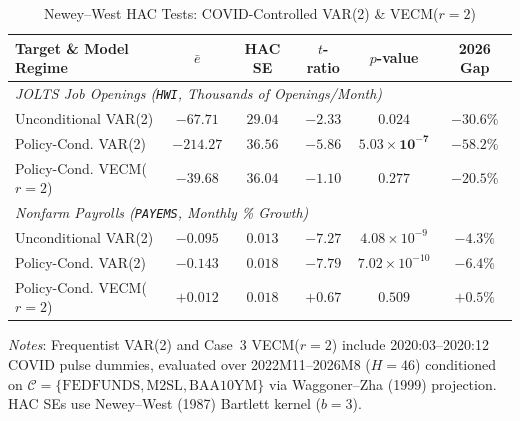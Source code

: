 \begin{table}[t]
\centering
\caption{Newey--West HAC Tests: COVID-Controlled VAR(2) \& VECM($r=2$)}
\label{tab:hac_tests}
\begin{minipage}{\columnwidth}
\centering
\fontsize{6.6pt}{8.0pt}\selectfont
\setlength{\tabcolsep}{1.5pt}
\begin{tabular}{lccccc}
\toprule
\textbf{Target \& Model Regime} & $\bar{e}$ & \textbf{HAC SE} & $t$-\textbf{ratio} & $p$-\textbf{value} & \textbf{2026 Gap} \\
\midrule
\multicolumn{6}{l}{\textit{JOLTS Job Openings (\texttt{HWI}, Thousands of Openings/Month)}} \\
Unconditional VAR(2) & $-67.71$ & $29.04$ & $-2.33$ & $0.024$ & $-30.6\%$ \\
Policy-Cond. VAR(2)  & $\mathbf{-214.27}$ & $\mathbf{36.56}$ & $\mathbf{-5.86}$ & $\mathbf{5.03 \times 10^{-7}}$ & $\mathbf{-58.2\%}$ \\
Policy-Cond. VECM($r=2$) & $-39.68$ & $36.04$ & $-1.10$ & $0.277$ & $-20.5\%$ \\
\midrule
\multicolumn{6}{l}{\textit{Nonfarm Payrolls (\texttt{PAYEMS}, Monthly \% Growth)}} \\
Unconditional VAR(2) & $-0.095$ & $0.013$ & $-7.27$ & $4.08 \times 10^{-9}$ & $-4.3\%$ \\
Policy-Cond. VAR(2)  & $-0.143$ & $0.018$ & $-7.79$ & $7.02 \times 10^{-10}$ & $-6.4\%$ \\
Policy-Cond. VECM($r=2$) & $\mathbf{+0.012}$ & $\mathbf{0.018}$ & $\mathbf{+0.67}$ & $\mathbf{0.509}$ & $\mathbf{+0.5\%}$ \\
\bottomrule
\end{tabular}
\vskip 2pt
{\scriptsize \textit{Notes}: Frequentist VAR(2) and Case~3 VECM($r=2$) include 2020:03--2020:12 COVID pulse dummies, evaluated over 2022M11--2026M8 ($H=46$) conditioned on $\mathcal{C}=\{\text{FEDFUNDS},\text{M2SL},\text{BAA10YM}\}$ via Waggoner--Zha (1999) projection. HAC SEs use Newey--West (1987) Bartlett kernel ($b=3$).\par}
\end{minipage}
\end{table}

